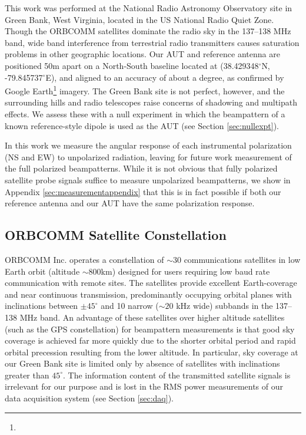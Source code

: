 This work was performed at the National Radio Astronomy Observatory site in Green Bank, West Virginia, located in the US National Radio Quiet Zone. Though the ORBCOMM satellites dominate the radio sky in the 137--138 MHz band, wide band interference from terrestrial radio transmitters causes saturation problems in other geographic locations. Our AUT and reference antenna are positioned 50m apart on a North-South baseline located at (38.429348$^\circ$N, -79.845737$^\circ$E), and aligned to an accuracy of about a degree, as confirmed by Google Earth\footnote{} imagery. The Green Bank site is not perfect, however, and the surrounding hills and radio telescopes raise concerns of  shadowing and multipath effects. We assess these with a null experiment in which the beampattern of a known reference-style dipole is used as the AUT (see Section \ref{sec:nullexpt}).

In this work we measure the angular response of each instrumental polarization (NS and EW) to unpolarized radiation, leaving for future work measurement of the full polarized beampatterns. While it is not obvious that fully polarized satellite probe signals suffice to measure unpolarized beampatterns, we show in Appendix \ref{sec:measurementappendix} that this is in fact possible if both our reference antenna and our AUT have the same polarization response. 

\subsection{ORBCOMM Satellite Constellation}
\label{sec:orbcomms}

ORBCOMM Inc. operates a constellation of $\sim30$ communications satellites in low Earth orbit (altitude $\sim800$km) designed for users requiring low baud rate communication with remote sites. The satellites provide excellent Earth-coverage and near continuous transmission, predominantly occupying orbital planes with inclinations between $\pm45^\circ$ and 10 narrow ($\sim20$ kHz wide) subbands in the 137--138 MHz band. An advantage of these satellites over higher altitude satellites (such as the GPS constellation) for beampattern measurements is that good sky coverage is achieved far more quickly due to the shorter orbital period and rapid orbital precession resulting from the lower altitude. In particular, sky coverage at our Green Bank site is limited only by absence of satellites with inclinations greater than $45^\circ$. The information content of the transmitted satellite signals is irrelevant for our purpose and is lost in the RMS power measurements of our data acquisition system (see Section \ref{sec:daq}). 

